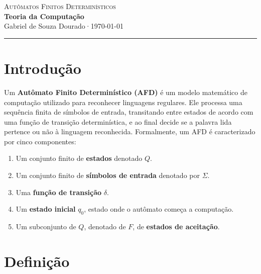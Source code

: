 \documentclass[12pt, a4paper]{article}
\theoremstyle{definition}
\theoremstyle{plain}
\theoremstyle{remark}
\newcommand{\docauthor}{Gabriel de Souza Dourado}
\newcommand{\doctitle}{Teoria da Computação}
\newcommand{\docsubtitle}{Autômatos Finitos Determinísticos}
\newcommand{\docdate}{\today}
\begin{document}
\begin{center}
  {\large \textcolor{mainblue}{\textsc{\docsubtitle}}}\\[0.4em]
  {\LARGE \textbf{\doctitle}}\\[0.6em]
  {\small \docauthor \quad·\quad \docdate}
  \vspace{0.4em}
  \hrule
\end{center}

\vspace{1em}


\section{Introdução}

Um \textbf{Autômato Finito Determinístico (AFD)} é um modelo matemático de computação utilizado para reconhecer linguagens regulares. Ele processa uma sequência finita de símbolos de entrada, transitando entre estados de acordo com uma função de transição determinística, e ao final decide se a palavra lida pertence ou não à linguagem reconhecida. Formalmente, um AFD é caracterizado por cinco componentes:

\begin{enumerate}
    \item Um conjunto finito de \textbf{estados} denotado $Q$.
    \item Um conjunto finito de \textbf{símbolos de entrada} denotado por $\Sigma$.
    \item Uma \textbf{função de transição} $\delta$.
    \item Um \textbf{estado inicial} $q_0$, estado onde o autômato começa a computação.
    \item Um subconjunto de $Q$, denotado de $F$, de \textbf{estados de aceitação}.
\end{enumerate}

\section{Definição}
\end{document}
